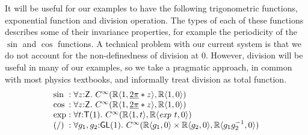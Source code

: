 \documentclass[preprint]{sigplanconf}
\theoremstyle{examplestyle}
\begin{document}
It will be useful for our examples to have the following trigonometric
functions, exponential function and division operation. The types of
each of these functions describes some of their invariance properties,
for example the periodicity of the $\sin$ and $\cos$ functions. A
technical problem with our current system is that we do not account
for the non-definedness of division at $0$. However, division will be
useful in many of our examples, so we take a pragmatic approach, in
common with most physics textbooks, and informally treat division as
total function.
\begin{displaymath}
  \begin{array}{l@{\hspace{0.3em}}c@{\hspace{0.3em}}l}
    \sin &:& \forall z \mathord: \mathsf{Z}.~C^\infty(\mathbb{R}\langle 1, \underline{2\pi} * z \rangle, \mathbb{R} \langle 1, 0 \rangle) \\
    \cos &:& \forall z \mathord: \mathsf{Z}.~C^\infty(\mathbb{R}\langle 1, \underline{2\pi} * z \rangle, \mathbb{R} \langle 1, 0 \rangle) \\
    \mathrm{exp} &:& \forall t \mathord: \mathsf{T}(1).~C^\infty(\mathbb{R}\langle 1, t \rangle, \mathbb{R}\langle \mathit{exp}~t, 0 \rangle) \\
    (/) &:& \forall g_1, g_2 \mathord: \mathsf{GL}(1).~C^\infty(\mathbb{R}\langle g_1, 0 \rangle \times \mathbb{R}\langle g_2, 0\rangle, \mathbb{R}\langle g_1g_2^{-1}, 0 \rangle)
  \end{array}
\end{displaymath}
\end{document}
